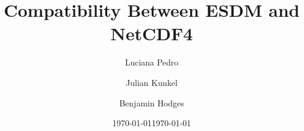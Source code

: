 \documentclass[a4paper,12pt]{esiwace-modified}
\title{Compatibility Between ESDM and NetCDF4}
\author{
Luciana Pedro
\and Julian Kunkel
\and Benjamin Hodges
}
\date{\today} %
\begin{document}
\date{\today}

\maketitle

\tableofcontents

\parskip 12pt


\newpage



\clearpage



\clearpage











\clearpage



\clearpage



\clearpage



\clearpage



\clearpage



% 

\begin{appendices}

\end{appendices}

\end{document}
